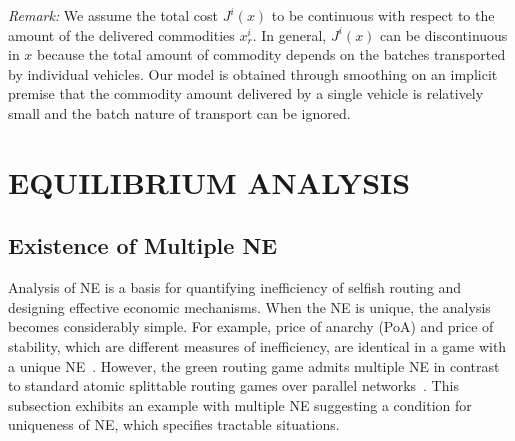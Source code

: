 \documentclass[letterpaper, 10 pt, conference]{ieeeconf}  %
\begin{document}
\emph{Remark:} We assume the total cost $J^i(x)$ to be continuous with respect to the amount of the delivered commodities $x^i_r$.
In general, $J^i(x)$ can be discontinuous in $x$ because the total amount of commodity depends on the batches transported by individual vehicles.
Our model is obtained through smoothing on an implicit premise that the commodity amount delivered by a single vehicle is relatively small and the batch nature of transport can be ignored.

\section{EQUILIBRIUM ANALYSIS}
\label{sec:ana}

\subsection{Existence of Multiple NE}
\label{subsec:ex}

Analysis of NE is a basis for quantifying inefficiency of selfish routing and designing effective economic mechanisms.
When the NE is unique, the analysis becomes considerably simple.
For example, price of anarchy (PoA) and price of stability, which are different measures of inefficiency, are identical in a game with a unique NE~\cite[Chap.~17]{Roughgarden2007Game}.
However, the green routing game admits multiple NE in contrast to standard atomic splittable routing games over parallel networks~\cite{Orda1993Competitive,Jacquot2018Analysis}.
This subsection exhibits an example with multiple NE suggesting a condition for uniqueness of NE, which specifies tractable situations.%


\end{document}
